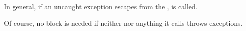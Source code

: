 \label{exceptions}

In general, if an uncaught exception escapes from the \entryfn,
 is called.


Of course, no  block is needed if neither \entryfn\xspace nor
anything it calls throws exceptions.
